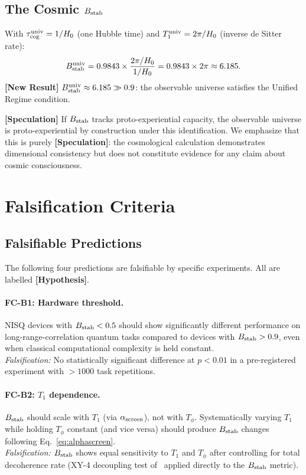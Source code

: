 \documentclass[12pt,letterpaper]{article}
\theoremstyle{definition}
\theoremstyle{remark}
\newcommand{\hypothesis}{\textbf{[Hypothesis]}}
\newcommand{\newresult}{\textbf{[New Result]}}
\newcommand{\speculation}{\textbf{[Speculation]}}
\newcommand{\ascreen}{\alpha_{\rm screen}}
\newcommand{\Bstab}{B_{\rm stab}}
\newcommand{\taucog}{\tau_{\rm cog}}
\begin{document}
\subsection{The Cosmic \texorpdfstring{$\Bstab$}{B\_stab}}

With $\taucog^{\rm univ} = 1/H_0$ (one Hubble time) and
$T_1^{\rm univ} = 2\pi/H_0$ (inverse de Sitter rate):
\begin{equation}
\Bstab^{\rm univ}
  = 0.9843 \times \frac{2\pi/H_0}{1/H_0}
  = 0.9843\times 2\pi \approx 6.185.
\label{eq:BstabUniv}
\end{equation}
\newresult{} $\Bstab^{\rm univ}\approx 6.185 \gg 0.9$: the observable universe
satisfies the Unified Regime condition.

\speculation{} If $\Bstab$ tracks proto-experiential capacity, the observable universe
is proto-experiential by construction under this identification.
We emphasize that this is purely \speculation{}: the cosmological calculation
demonstrates dimensional consistency but does not constitute evidence for any
claim about cosmic consciousness.

\section{Falsification Criteria}
\label{sec:falsification}

\subsection{Falsifiable Predictions}

The following four predictions are falsifiable by specific experiments.
All are labelled \hypothesis{}.

\paragraph{FC-B1: Hardware threshold.}
NISQ devices with $\Bstab < 0.5$ should show significantly different performance
on long-range-correlation quantum tasks compared to devices with $\Bstab > 0.9$,
even when classical computational complexity is held constant.\\
\textit{Falsification:} No statistically significant difference at $p < 0.01$ in
a pre-registered experiment with $> 1000$ task repetitions.

\paragraph{FC-B2: $T_1$ dependence.}
$\Bstab$ should scale with $T_1$ (via $\ascreen$), not with $T_\phi$.
Systematically varying $T_1$ while holding $T_\phi$ constant (and vice versa) should
produce $\Bstab$ changes following Eq.~\eqref{eq:alphascreen}.\\
\textit{Falsification:} $\Bstab$ shows equal sensitivity to $T_1$ and $T_\phi$ after
controlling for total decoherence rate (XY-4 decoupling test of~\cite{companion}
applied directly to the $\Bstab$ metric).
\end{document}
